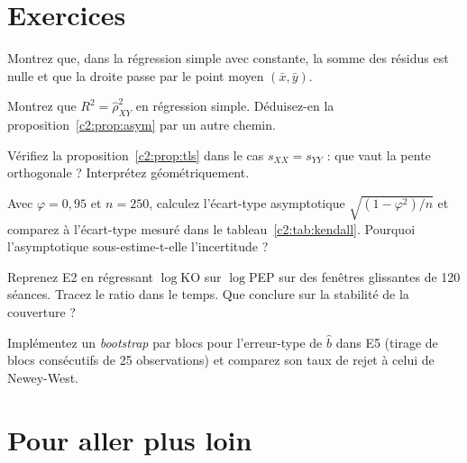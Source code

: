 \section{Exercices}

\begin{exercise}
Montrez que, dans la régression simple avec constante, la somme des résidus est nulle et que la droite passe par le point moyen $(\bar x,\bar y)$.
\end{exercise}

\begin{exercise}
Montrez que $R^2 = \hat\rho_{XY}^2$ en régression simple. Déduisez-en la proposition~\ref{c2:prop:asym} par un autre chemin.
\end{exercise}

\begin{exercise}
Vérifiez la proposition~\ref{c2:prop:tls} dans le cas $s_{XX} = s_{YY}$ : que vaut la pente orthogonale ? Interprétez géométriquement.
\end{exercise}

\begin{exercise}
Avec $\varphi = 0{,}95$ et $n = 250$, calculez l'écart-type asymptotique $\sqrt{(1-\varphi^2)/n}$ et comparez à l'écart-type mesuré dans le tableau~\ref{c2:tab:kendall}. Pourquoi l'asymptotique sous-estime-t-elle l'incertitude ?
\end{exercise}

\begin{exercise}[à coder]
Reprenez E2 en régressant $\log$KO sur $\log$PEP sur des fenêtres glissantes de 120 séances. Tracez le ratio dans le temps. Que conclure sur la stabilité de la \og couverture\fg{} ?
\end{exercise}

\begin{exercise}[à coder]
Implémentez un \emph{bootstrap} par blocs pour l'erreur-type de $\hat b$ dans E5 (tirage de blocs consécutifs de 25 observations) et comparez son taux de rejet à celui de Newey-West.
\end{exercise}

\section{Pour aller plus loin}

